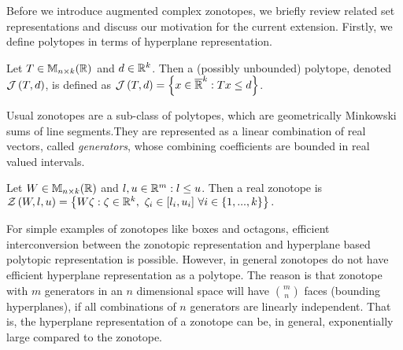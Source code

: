 
Before we introduce augmented complex zonotopes, we briefly review
related set representations and discuss our motivation for the
current extension.
Firstly, we define polytopes in terms of hyperplane representation.
%
\begin{definition}
Let $T\in\mathbb{M}_{n\times k}(\mathbb{\mathbb{R}})$ and $d\in\mathbb{R}^k$.  Then a (possibly
unbounded) polytope, denoted $\mathcal{J}\left(T,d\right)$, is defined as
$\mathcal{J}\left(T,d\right) = \left\{x\in\mathbb{\overline{R}}^k: Tx\leq d\right\}$.
\end{definition}
%
Usual zonotopes are a sub-class of polytopes, which are geometrically
Minkowski sums of line segments.They are represented as a linear
combination of real vectors, called \emph{generators}, whose combining
coefficients are bounded in real valued intervals.
\begin{definition}
Let $W\in\mathbb{M}_{n\times k}(\mathbb{\mathbb{R}})$ and $l,u\in\mathbb{R}^m: l\leq u$.  Then 
 a real zonotope is
$\mathcal{Z}\left(W,l,u\right) = \left\{W\zeta: \zeta\in\mathbb{R}^k,~\zeta_i\in[l_i,u_i]~\forall i\in \{1,...,k\}\right\}.$
\end{definition}
%
For simple examples of zonotopes like boxes and octagons, efficient
interconversion between the zonotopic representation and hyperplane
based polytopic representation is possible.  However, in general
zonotopes do not have efficient hyperplane representation as a
polytope.  The reason is that zonotope with $m$ generators in an $n$
dimensional space will have ${m}\choose{n}$ faces (bounding
hyperplanes), if all combinations of $n$ generators are linearly
independent.  That is, the hyperplane representation of a zonotope can
be, in general, exponentially large compared to the zonotope.  

